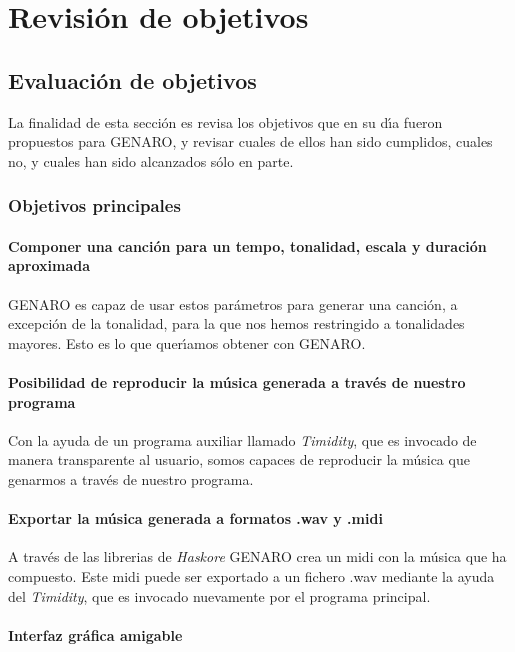 ﻿\chapter {Revisi\'on de objetivos}
\section{Evaluaci\'on de objetivos}
La finalidad de esta secci\'on es revisa los objetivos que en su d\'\i a fueron propuestos para GENARO, y revisar cuales de ellos han sido cumplidos, cuales no, y cuales han sido alcanzados s\'olo en parte.

\subsection{Objetivos principales}

\subsubsection{Componer una canci\'on para un tempo, tonalidad, escala y duraci\'on aproximada}

GENARO es capaz de usar estos par\'ametros para generar una canci\'on, a excepci\'on de la tonalidad, para la que nos hemos restringido a tonalidades mayores. Esto es lo que quer\'\i amos obtener con GENARO.

\subsubsection{Posibilidad de reproducir la m\'usica generada a trav\'es de nuestro programa}

Con la ayuda de un programa auxiliar llamado \emph{Timidity}, que es invocado de manera transparente al usuario, somos capaces de reproducir la m\'usica que genarmos a trav\'es de nuestro programa.

\subsubsection{Exportar la m\'usica generada a formatos .wav y .midi}

A trav\'es de las librerias de \emph{Haskore} GENARO crea un midi con la m\'usica que ha compuesto. Este midi puede ser exportado a un fichero .wav mediante la ayuda del \emph{Timidity}, que es invocado nuevamente por el programa principal.

\subsubsection{Interfaz gr\'afica amigable}

